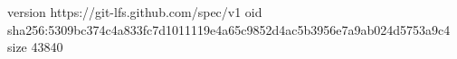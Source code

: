 version https://git-lfs.github.com/spec/v1
oid sha256:5309bc374c4a833fc7d1011119e4a65c9852d4ac5b3956e7a9ab024d5753a9c4
size 43840
